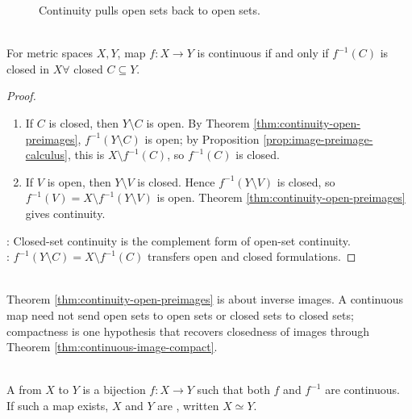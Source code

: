 \begin{figure}[H]
  \centering
  
  \caption{Continuity pulls open sets back to open sets.}
  \label{fig:continuity-preimage-open}
\end{figure}

\begin{corollary} \label{cor:continuity-closed-preimages} \\
For metric spaces $X,Y$, map $f:X\to Y$ is continuous if and only if $f^{-1}(C)$ is closed in $X \forall$ closed $C\subseteq Y$.
\begin{proof}
\begin{enumerate}[label=\roman*.]
\setlength{\itemsep}{0pt}
\item[$(\Rightarrow)$] If $C$ is closed, then $Y\setminus C$ is open. By Theorem \ref{thm:continuity-open-preimages}, $f^{-1}(Y\setminus C)$ is open; by Proposition \ref{prop:image-preimage-calculus}, this is $X\setminus f^{-1}(C)$, so $f^{-1}(C)$ is closed.
\item[$(\Leftarrow)$] If $V$ is open, then $Y\setminus V$ is closed. Hence $f^{-1}(Y\setminus V)$ is closed, so $f^{-1}(V)=X\setminus f^{-1}(Y\setminus V)$ is open. Theorem \ref{thm:continuity-open-preimages} gives continuity.
\end{enumerate}
: Closed-set continuity is the complement form of open-set continuity.\\
: $f^{-1}(Y\setminus C)=X\setminus f^{-1}(C)$ transfers open and closed formulations.
\end{proof}
\end{corollary}

\begin{remark} \label{rem:continuity-controls-preimages-not-images} \\
Theorem \ref{thm:continuity-open-preimages} is about inverse images. A continuous map need not send open sets to open sets or closed sets to closed sets; compactness is one hypothesis that recovers closedness of images through Theorem \ref{thm:continuous-image-compact}.
\end{remark}

\begin{definition} \label{def:homeomorphism} \\
A  from $X$ to $Y$ is a bijection $f:X\to Y$ such that both $f$ and $f^{-1}$ are continuous.\\
If such a map exists, $X$ and $Y$ are , written $X\simeq Y$.
\end{definition}

